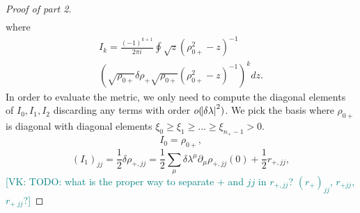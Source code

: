 \documentclass[american,aps,pra,reprint,floatfix,nofootinbib,superscriptaddress]{revtex4-2}
\newcommand{\VK}[1]{\textcolor{teal}{[VK: #1]}}
\begin{document}
\begin{proof}[Proof of part 2]
\begin{multline}
  \end{multline}
  where
  \begin{multline}
    I_k = \frac{(-1)^{k+1}}{2\pi i} \oint \sqrt{z}
    \left(\rho_{0{+}}^2 - z\right)^{-1}\\
    \left(\sqrt{\rho_{0{+}}} \delta \rho_{+} \sqrt{\rho_{0{+}}} \left(\rho_{0{+}}^2 - z\right)^{-1}\right)^{k} dz.
  \end{multline}
  In order to evaluate the metric, we only need to compute the diagonal elements
  of $I_0, I_1, I_2$ discarding any terms with order $o(\abs{\delta \lambda}^2)$.
  We pick the basis where $\rho_{0{+}}$ is diagonal with diagonal elements
  $\xi_0 \geq \xi_1 \geq \dots \geq \xi_{n_{+}-1} > 0$.
  \begin{equation}
    I_0 = \rho_{0{+}},
  \end{equation}
  \begin{equation}
    (I_1)_{jj} = \frac12 \delta \rho_{{+},jj}
    = \frac12 \sum_{\mu} \delta\lambda^{\mu} \partial_{\mu} \rho_{{+},jj}(0)
      + \frac12 r_{{+},jj},
  \end{equation}
  \VK{TODO: what is the proper way to separate ${+}$ and $jj$ in $r_{{+},jj}$?
  $(r_{+})_{jj}$, $r_{{+}jj}$, $r_{{+}\;jj}$?}


\end{proof}
\end{document}

